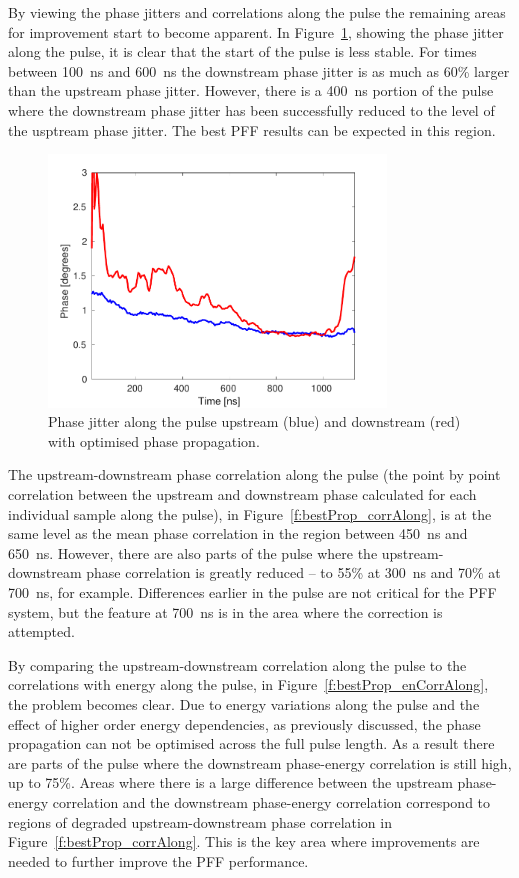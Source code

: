 By viewing the phase jitters and correlations along the pulse the remaining areas for improvement start to become apparent. In Figure~\ref{f:bestProp_jitAlong}, showing the phase jitter along the pulse, it is clear that the start of the pulse is less stable. For times between 100~ns and 600~ns the downstream phase jitter is as much as 60\% larger than the upstream phase jitter.  However, there is a 400~ns portion of the pulse where the downstream phase jitter has been successfully reduced to the level of the usptream phase jitter. The best PFF results can be expected in this region.

\begin{figure}
  \centering
  \includegraphics[width=0.8\textwidth]{Figures/propagation/bestProp_jitAlong}
  \caption{Phase jitter along the pulse upstream (blue) and downstream (red) with optimised phase propagation.}
  \label{f:bestProp_jitAlong}
\end{figure}

The upstream-downstream phase correlation along the pulse (the point by point correlation between the upstream and downstream phase calculated for each individual sample along the pulse), in Figure~\ref{f:bestProp_corrAlong}, is at the same level as the mean phase correlation in the region between 450~ns and 650~ns. However, there are also parts of the pulse where the upstream-downstream phase correlation is greatly reduced -- to 55\% at 300~ns and 70\% at 700~ns, for example. Differences earlier in the pulse are not critical for the PFF system, but the feature at 700~ns is in the area where the correction is attempted.

By comparing the upstream-downstream correlation along the pulse to the correlations with energy along the pulse, in Figure~\ref{f:bestProp_enCorrAlong}, the problem becomes clear. Due to energy variations along the pulse and the effect of higher order energy dependencies, as previously discussed, the phase propagation can not be optimised across the full pulse length. As a result there are parts of the pulse where the downstream phase-energy correlation is still high, up to 75\%. Areas where there is a large difference between the upstream phase-energy correlation and the downstream phase-energy correlation correspond to regions of degraded upstream-downstream phase correlation in Figure~\ref{f:bestProp_corrAlong}. This is the key area where improvements are needed to further improve the PFF performance.

